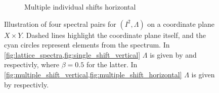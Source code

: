 \begin{figure}[t]
\begin{subfigure}{.47\textwidth}
        \caption{Multiple individual shifts horizontal}
        \label{fig:multiple_shift_horizontal}
    \end{subfigure}
    \caption{Illustration of four spectral pairs for $(I^2,\Lambda)$ on a coordinate plane $X\times Y$. Dashed lines highlight the coordinate plane itself, and the cyan circles represent elements from the spectrum. In \cref{fig:lattice_spectra,fig:single_shift_vertical} $\Lambda$ is given by  and  respectivly, where $\beta=0.5$ for the latter. In \cref{fig:multiple_shift_vertical,fig:multiple_shift_horizontal} $\Lambda$ is given by  respectivly.}
    \label{fig:spectra_figures}
\end{figure}





